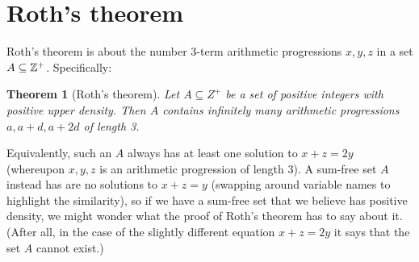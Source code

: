\documentclass{report}
\newtheorem{theorem}{Theorem}[section]
\theoremstyle{remark}
\numberwithin{equation}{section}
\begin{document}









\section{Roth's theorem}

Roth's theorem is about the number 3-term arithmetic progressions
$x, y, z$ in a set $A \subseteq \mathbb{Z}^+$.  Specifically: 


\begin{theorem}[Roth's theorem]
  Let $A \subseteq Z^+$ be a set of positive integers with positive
  upper density.  Then $A$ contains infinitely many arithmetic
  progressions $a, a+d, a+2d$ of length 3.  
\end{theorem}

Equivalently, such an $A$ always has at least one solution to $x+z=2y$
(whereupon $x, y, z$ is an arithmetic progression of length $3$).  A
sum-free set $A$ instead has are no solutions to $x+z=y$ (swapping
around variable names to highlight the similarity), so if we have a
sum-free set that we believe has positive density, we might wonder
what the proof of Roth's theorem has to say about it.  (After all, in
the case of the slightly different equation $x+z=2y$ it says that the
set $A$ cannot exist.)
\end{document}
